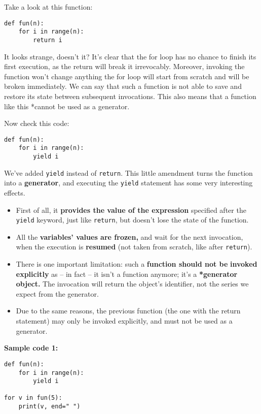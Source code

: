 \documentclass[11pt]{article}
\begin{document}
Take a look at this function:

\begin{verbatim}
def fun(n):
    for i in range(n):
        return i
\end{verbatim}

It looks strange, doesn’t it? It’s clear that the for loop has no
chance to finish its first execution, as the return will break it
irrevocably. Moreover, invoking the function won’t change anything the
for loop will start from scratch and will be broken immediately. We
can say that such a function is not able to save and restore its state
between subsequent invocations. This also means that a function like
this *cannot be used as a generator.

Now check this code:

\begin{verbatim}
def fun(n):
    for i in range(n):
        yield i
\end{verbatim}

We’ve added \texttt{yield} instead of \texttt{return}. This little amendment turns
the function into a \textbf{generator}, and executing the \texttt{yield} statement has
some very interesting effects.

\begin{itemize}
\item First of all, it \textbf{provides the value of the expression} specified
after the \texttt{yield} keyword, just like \texttt{return}, but doesn’t lose the
state of the function.
\item All the \textbf{variables’ values are frozen,} and wait for the next
invocation, when the execution is \textbf{resumed} (not taken from scratch,
like after \texttt{return}).
\item There is one important limitation: such a \textbf{function should not be}
\textbf{invoked explicitly} as – in fact – it isn’t a function anymore;
it’s a \textbf{*generator object.} The invocation will return the object’s 
identifier, not the series we expect from the generator.
\item Due to the same reasons, the previous function (the one with the
return statement) may only be invoked explicitly, and must not be
used as a generator.
\end{itemize}

\vspace{10 mm}

\textbf{Sample code 1:} 
\begin{verbatim}
def fun(n):
    for i in range(n):
        yield i

for v in fun(5):
    print(v, end=" ")
\end{verbatim}
\end{document}
